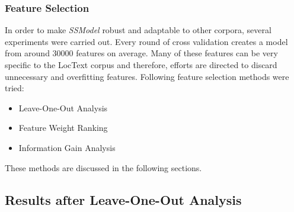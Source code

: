 \subsubsection{Feature Selection}

In order to make \textit{SSModel} robust and adaptable to other corpora, several experiments were carried out. Every round of cross validation creates a model from around 30000 features on average. Many of these features can be very specific to the LocText corpus and therefore, efforts are directed to discard unnecessary and overfitting features. Following feature selection methods were tried:

\begin{itemize}

\item Leave-One-Out Analysis
\item Feature Weight Ranking
\item Information Gain Analysis

\end{itemize}

These methods are discussed in the following sections.

\subsection{Results after Leave-One-Out Analysis}

